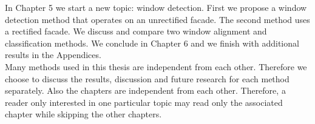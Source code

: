 In Chapter 5 we start a new topic: window detection. First we propose a window
detection method that operates on an unrectified facade. The second method uses
a rectified facade. We discuss and compare two window alignment and
classification methods.  We conclude in Chapter 6 and we finish with additional
results in the Appendices.\\

Many methods used in this thesis are independent from each other. Therefore we
choose to discuss the results, discussion and future research for each method
separately.  Also the chapters are independent from each other. Therefore, a
reader only interested in one particular topic may read only the associated
chapter while skipping the other chapters.



